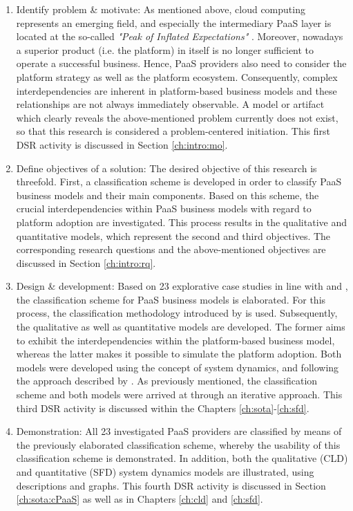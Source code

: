 \begin{enumerate}
	\item Identify problem \& motivate: As mentioned above, cloud computing represents an emerging field, and especially the intermediary \ac{PaaS} layer is located at the so-called \textit{"Peak of Inflated Expectations"} \citep[p. 5]{Smith2012}. Moreover, nowadays a superior product (i.e. the platform) in itself is no longer sufficient to operate a successful business. Hence, \ac{PaaS} providers also need to consider the platform strategy as well as the platform ecosystem. Consequently, complex interdependencies are inherent in platform-based business models and these relationships are not always immediately observable. A model or artifact which clearly reveals the above-mentioned problem currently does not exist, so that this research is considered a problem-centered initiation. This first \ac{DSR} activity is discussed in Section \ref{ch:intro:mo}.
	\item Define objectives of a solution: The desired objective of this research is threefold. First, a classification scheme is developed in order to classify \ac{PaaS} business models and their main components. Based on this scheme, the crucial interdependencies within \ac{PaaS} business models with regard to platform adoption are investigated. This process results in the qualitative and quantitative models, which represent the second and third objectives. The corresponding research questions and the above-mentioned objectives are discussed in Section \ref{ch:intro:rq}.
	\item Design \& development: Based on 23 explorative case studies in line with \citet{Eisenhardt1989} and \citet{Yin2008}, the classification scheme for \ac{PaaS} business models is elaborated. For this process, the classification methodology introduced by \citet{Fettke2003} is used. Subsequently, the qualitative as well as quantitative models are developed. The former aims to exhibit the interdependencies within the platform-based business model, whereas the latter makes it possible to simulate the platform adoption. Both models were developed using the concept of system dynamics, and following the approach described by \citet{Sterman2000,Sterman2001}. As previously mentioned, the classification scheme and both models were arrived at through an iterative approach. This third \ac{DSR} activity is discussed within the Chapters \ref{ch:sota}-\ref{ch:sfd}.
	\item Demonstration: All 23 investigated \ac{PaaS} providers are classified by means of the previously elaborated classification scheme, whereby the usability of this classification scheme is demonstrated. In addition, both the qualitative (\ac{CLD}) and quantitative (\ac{SFD}) system dynamics models are illustrated, using descriptions and graphs. This fourth \ac{DSR} activity is discussed in Section \ref{ch:sota:cPaaS} as well as in Chapters \ref{ch:cld} and \ref{ch:sfd}.

\end{enumerate}
